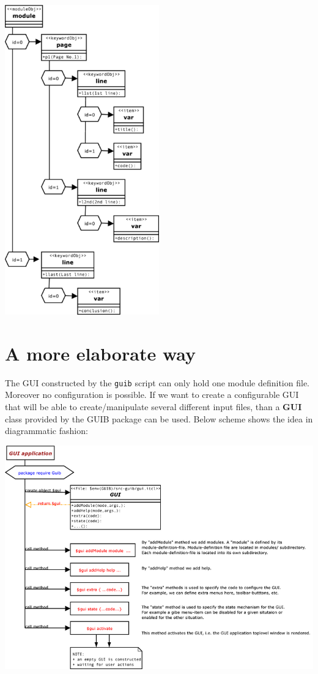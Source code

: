 \documentclass[12pt]{article}
\def\key#1{{\bf #1}}
\begin{document}
\includegraphics[width=0.5\textwidth]{diagrams/parsing.png}


\section{A more elaborate way}

The GUI constructed by the {\tt guib} script can only hold one module
definition file. Moreover no configuration is possible. If we want to
create a configurable GUI that will be able to create/manipulate
several different input files, than a \key{GUI} class provided by the
GUIB package can be used. Below scheme shows the idea in diagrammatic
fashion:

\includegraphics[width=1.0\textwidth]{diagrams/myGUI.png}
\end{document}
